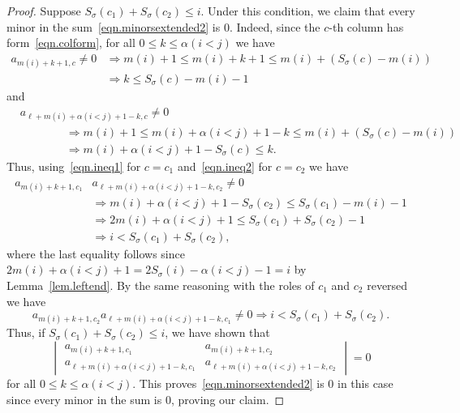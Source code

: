 \documentclass[10pt,a4paper]{amsart}
\newcommand{\al}{\alpha}
\newcommand{\gs}{\sigma}
\newcommand{\mi}[1]{m(#1)}
\begin{document}
\begin{proof}
Suppose $S_\gs(c_1)+S_\gs(c_2)\leq i$. Under this condition, we claim that every minor in the sum~\eqref{eqn.minorsextended2} is $0$. Indeed, since the $c$-th column has form~\eqref{eqn.colform}, for all $0\leq k \leq \al(i<j)$ we have 
\begin{align}\label{eqn.ineq1}
a_{\mi{i}+k+1, c} \neq 0 & \Rightarrow  \mi{i}+1 \leq \mi{i} +k + 1 \leq \mi{i}+(S_\gs(c)-\mi{i}) \\
\nonumber &\Rightarrow k \leq S_\gs(c)-\mi{i}  -1
\end{align}
and 
\begin{align} \label{eqn.ineq2}
&a_{\ell+\mi{i}+\al(i<j) +1 - k, c} \neq 0 \\
\nonumber  & \qquad \qquad \Rightarrow  \mi{i}+1  \leq  \mi{i} + \alpha(i<j)+1 - k \leq  \mi{i} + (S_\gs(c)-\mi{i}) \\
\nonumber & \qquad \qquad \Rightarrow  \mi{i}+ \al(i<j) +1 - S_\gs(c) \leq k.
\end{align}
Thus, using~\eqref{eqn.ineq1} for $c=c_1$ and~\eqref{eqn.ineq2} for $c=c_2$ we have
\begin{align*}
a_{\mi{i}+k+1, c_1}&a_{\ell+\mi{i}+\al(i<j) +1 - k, c_2} \neq 0 \\ &\Rightarrow   \mi{i}+ \al(i<j) +1 - S_\gs(c_2)  \leq S_\gs(c_1)-\mi{i}  -1 \\
&\Rightarrow  2\mi{i} +\al (i<j) +1 \leq S_\gs(c_1)+S_\gs(c_2) -1 \\
&\Rightarrow i  < S_\gs(c_1)+S_\gs(c_2),
\end{align*}
where the last equality follows since $2\mi{i} +\al (i<j) +1 = 2S_\gs(i) -\al(i<j)-1 = i$ by Lemma~\ref{lem.leftend}. By the same reasoning with the roles of $c_1$ and $c_2$ reversed we have 
\[
a_{\mi{i}+k+1, c_2}a_{\ell+\mi{i}+\al(i<j) +1 - k, c_1} \neq 0 \Rightarrow i  < S_\gs(c_1)+S_\gs(c_2).
\]
Thus, if $S_\gs(c_1)+S_\gs(c_2)\leq i$, we have shown that  
\[
\begin{vmatrix} a_{\mi{i}+k+1, c_1} & a_{\mi{i}+k+1, c_2}\\ a_{\ell+\mi{i}+\al(i<j) +1 - k, c_1} & a_{\ell+\mi{i}+\al(i<j) +1 - k, c_2}  \end{vmatrix} =0
\]
for all $0\leq k \leq \al(i<j)$. This proves~\eqref{eqn.minorsextended2} is $0$ in this case since every minor in the sum is $0$, proving our claim. 







\end{proof}
\end{document}
